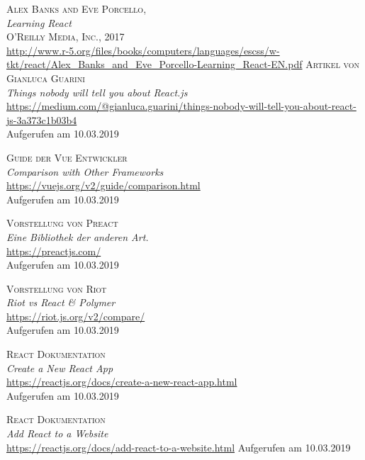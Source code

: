 \documentclass[twoside,12pt,a4paper]{report}
\begin{document}
\begin{thebibliography}{9}
  \textsc{Alex Banks and Eve Porcello}, \\
  \textit{Learning React}\\
  \textsc{O’Reilly Media, Inc., 2017}\\
  \href{http://www.r-5.org/files/books/computers/languages/escss/w-tkt/react/Alex_Banks_and_Eve_Porcello-Learning_React-EN.pdf}{http://www.r-5.org/files/books/computers/languages/escss/w-tkt/react/Alex\_Banks\_and\_Eve\_Porcello-Learning\_React-EN.pdf}
  \clearpage
  \textsc{Artikel von Gianluca Guarini}\\
  \textit{Things nobody will tell you about React.js}\\
  \href{https://medium.com/@gianluca.guarini/things-nobody-will-tell-you-about-react-js-3a373c1b03b4}{https://medium.com/@gianluca.guarini/things-nobody-will-tell-you-about-react-js-3a373c1b03b4}\\
  Aufgerufen am 10.03.2019

  \textsc{Guide der Vue Entwickler}\\
  \textit{Comparison with Other Frameworks}\\
  \href{https://vuejs.org/v2/guide/comparison.html}{https://vuejs.org/v2/guide/comparison.html}\\
  Aufgerufen am 10.03.2019

  \textsc{Vorstellung von Preact}\\
  \textit{Eine Bibliothek der anderen Art.}\\
  \href{https://preactjs.com/}{https://preactjs.com/}\\
  Aufgerufen am 10.03.2019

  \textsc{Vorstellung von Riot}\\
  \textit{Riot vs React \& Polymer}\\
  \href{https://riot.js.org/v2/compare/}{https://riot.js.org/v2/compare/}\\
  Aufgerufen am 10.03.2019

  \textsc{React Dokumentation}\\
  \textit{Create a New React App}\\
  \href{https://reactjs.org/docs/create-a-new-react-app.html}{https://reactjs.org/docs/create-a-new-react-app.html}\\
  Aufgerufen am 10.03.2019

  \textsc{React Dokumentation}\\
  \textit{Add React to a Website}\\
  \href{https://reactjs.org/docs/add-react-to-a-website.html}{https://reactjs.org/docs/add-react-to-a-website.html}
  Aufgerufen am 10.03.2019


\end{thebibliography}
\end{document}
